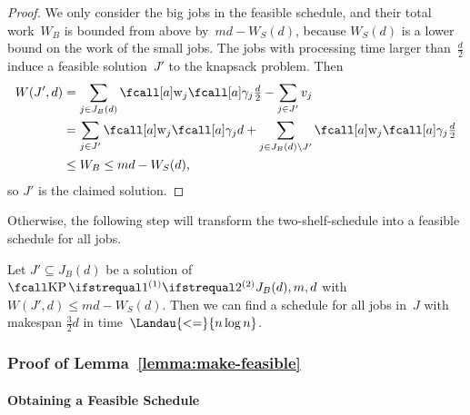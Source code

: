 \begin{proof}
  We only consider the big jobs in the feasible schedule,
  and their total work~$W_B$ is bounded from above by~$md - W_S(d)$,
  because $W_S(d)$ is a lower bound on the work of the small jobs.
  The jobs with processing time larger than~$\frac{d}{2}$
  induce a feasible solution~$J'$ to the knapsack problem.
  Then
  \begin{equation}
    \begin{aligned}
      W(J', d) &= \sum_{j \in J_B(d)} \work{j}{\procnum{j}{\textstyle\frac{d}{2}}} - \sum_{j \in J'} v_j \\
      &= \sum_{j \in J'} \work{j}{\procnum{j}{d}} 
       + \sum_{j \in J_B(d) \setminus J'}  \work{j}{\procnum{j}{\textstyle\frac{d}{2}}} \\
      &\leq W_B 
      \leq md - W_S(d) \dpunct{,}
    \end{aligned}
  \end{equation}
  so $J'$ is the claimed solution.
\end{proof}

Otherwise, the following step will transform the two-shelf-schedule
into a feasible schedule for all jobs.

\begin{lemma}
  \label{lemma:make-feasible}
  Let $J' \subseteq J_B(d)$ be a solution of $\KP{J_B(d)}{m,d}$
  with $W(J', d) \leq md - W_S(d)$.
  Then we can find a schedule for all jobs in~$J$
  with makespan $\frac{3}{2}d$ in time~$\Landau{<=}{n \log n}$.
\end{lemma}


\subsubsection{Proof of Lemma~\ref{lemma:make-feasible}}

\paragraph{Obtaining a Feasible Schedule}
\label{sec:transformation-rules}

